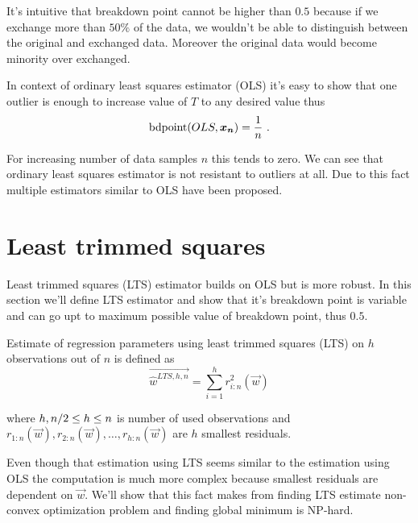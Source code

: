 It's intuitive that breakdown point cannot be higher than $0.5$ \cite{rouss:1986} because if we exchange more than $50\%$ of the data, we wouldn't be able to distinguish between the original and exchanged data. Moreover the original data would become minority over exchanged.


In context of ordinary least squares estimator (OLS) it's easy to show that one outlier is enough to increase value of $T$ to any desired value thus 
\begin{equation}
    \bdpoint(OLS,\vec{x_n} ) = \frac{1}{n}\ .
\end{equation}

For increasing number of data samples $n$ this tends to zero. We can see that ordinary least squares estimator is not resistant to outliers at all. Due to this fact multiple estimators similar to OLS have been proposed. 


\section{Least trimmed squares}
Least trimmed squares (LTS) estimator builds on OLS but is more robust. In this section we'll define LTS estimator and show that it's breakdown point is variable and can go upt to maximum possible value of breakdown point, thus $0.5$.


\begin{definition} Estimate of regression parameters using least trimmed squares (LTS) on $h$ observations out of $n$ is defined as
    \begin{equation}
        \vec{\hat{w}^{LTS, h, n}} =  \sum\limits_{i=1}^h r_{i:n}^2(\vec{w}) 
    \end{equation}

    where $h\\, n/2 \leq h \leq n$ is number of used observations and 
    $r_{1:n}(\vec{w}), r_{2:n}(\vec{w}),\ldots, r_{h:n}(\vec{w})$ are $h$ smallest residuals.
\end{definition}

Even though that estimation using LTS seems similar to the estimation using OLS the computation is much more complex because smallest residuals are dependent on $\vec{w}$. We'll show that this fact makes from finding LTS estimate non-convex optimization problem and finding global minimum is NP-hard. 